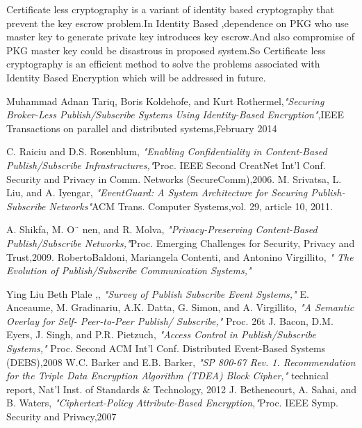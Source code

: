 \documentclass[MTech]{iitmdiss}
\begin{document}
Certificate less cryptography is  a variant of identity based cryptography that prevent the key escrow problem.In Identity Based   ,dependence on PKG who use master key to generate private key introduces key escrow.And also compromise of PKG master key could be disastrous in  proposed system.So Certificate less cryptography is an efficient method to solve the problems associated with   Identity Based Encryption which will be addressed in future.
\pagestyle{empty}
\begin{singlespace}
  \begin{thebibliography}{1}
\bibitem{}
Muhammad Adnan Tariq, Boris Koldehofe, and Kurt Rothermel,\textit{"Securing Broker-Less Publish/Subscribe Systems Using Identity-Based Encryption"},IEEE Transactions on parallel and distributed systems,February 2014

\bibitem{}
C. Raiciu and D.S. Rosenblum, \textit{"Enabling Confidentiality in
Content-Based Publish/Subscribe Infrastructures,"}Proc. IEEE
Second CreatNet Int’l Conf. Security and Privacy in Comm. Networks
(SecureComm),2006.
\bibitem{}
M. Srivatsa, L. Liu, and A. Iyengar, \textit{"EventGuard: A System
Architecture for Securing Publish-Subscribe Networks"}ACM
Trans. Computer Systems,vol. 29, article 10, 2011.

\bibitem{}
A. Shikfa, M. O¨
nen, and R. Molva, \textit{"Privacy-Preserving Content-Based Publish/Subscribe Networks,"}Proc. Emerging Challenges for
Security, Privacy and Trust,2009.
\bibitem{}
RobertoBaldoni, Mariangela Contenti, and Antonino Virgillito, \textit{" The Evolution of Publish/Subscribe
Communication Systems,"} 

\bibitem{}
Ying Liu Beth Plale
,,\textit{ "Survey of Publish Subscribe Event Systems,"}
\bibitem{}
E. Anceaume, M. Gradinariu, A.K. Datta, G. Simon, and A.
Virgillito, \textit{"A Semantic Overlay for Self- Peer-to-Peer Publish/
Subscribe,"} Proc. 26t
\bibitem{}
J. Bacon, D.M. Eyers, J. Singh, and P.R. Pietzuch, \textit{"Access Control
in Publish/Subscribe Systems,"} Proc. Second ACM Int’l Conf.
Distributed Event-Based Systems (DEBS),2008
\bibitem{}
W.C. Barker and E.B. Barker, \textit{"SP 800-67 Rev. 1. Recommendation
for the Triple Data Encryption Algorithm (TDEA) Block Cipher,"}
technical report, Nat’l Inst. of Standards & Technology, 2012
\bibitem{}
J. Bethencourt, A. Sahai, and B. Waters, \textit{"Ciphertext-Policy
Attribute-Based Encryption,"}Proc. IEEE Symp. Security and
Privacy,2007

\end{thebibliography}
\end{singlespace}


  
\end{document}
